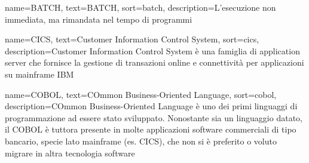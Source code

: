 
%
%



{
    name=BATCH,
    text=BATCH,
    sort=batch,
    description={L'esecuzione non immediata, ma rimandata nel tempo di programmi}
}

{
    name=CICS,
    text=Customer Information Control System,
    sort=cics,
    description={Customer Information Control System è una famiglia di application server che fornisce la gestione di transazioni online e connettività per applicazioni su mainframe IBM}
}

{
    name=COBOL,
    text=COmmon Business-Oriented Language,
    sort=cobol,
    description={COmmon Business-Oriented Language è uno dei primi linguaggi di programmazione ad essere stato sviluppato. Nonostante sia un linguaggio datato, il COBOL è tuttora presente in molte applicazioni software commerciali di tipo bancario, specie lato mainframe (es. CICS), che non si è preferito o voluto migrare in altra tecnologia software}
}


 
